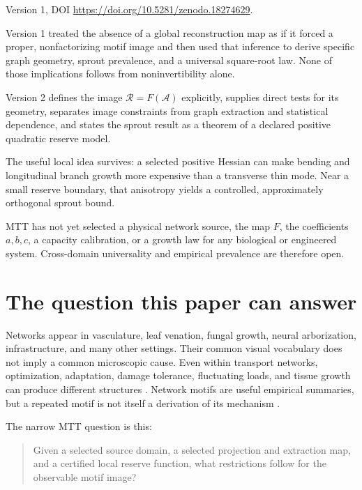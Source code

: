 \documentclass[11pt]{article}
\newcommand{\Adm}{\mathcal A}
\newcommand{\Image}{\mathcal R}
\begin{document}
\begin{description}[style=nextline]
\item[Supersedes.]
Version 1, DOI
\url{https://doi.org/10.5281/zenodo.18274629}.
\item[Reason.]
Version 1 treated the absence of a global reconstruction map as if it forced
a proper, nonfactorizing motif image and then used that inference to derive
specific graph geometry, sprout prevalence, and a universal square-root
law.  None of those implications follows from noninvertibility alone.
\item[Resolution.]
Version 2 defines the image $\Image=F(\Adm)$ explicitly, supplies direct
tests for its geometry, separates image constraints from graph extraction
and statistical dependence, and states the sprout result as a theorem of a
declared positive quadratic reserve model.
\item[Retained content.]
The useful local idea survives: a selected positive Hessian can make bending
and longitudinal branch growth more expensive than a transverse thin mode.
Near a small reserve boundary, that anisotropy yields a controlled,
approximately orthogonal sprout bound.
\item[Open boundary.]
MTT has not yet selected a physical network source, the map $F$, the
coefficients $a,b,c$, a capacity calibration, or a growth law for any
biological or engineered system.  Cross-domain universality and empirical
prevalence are therefore open.
\end{description}

\tableofcontents

\section{The question this paper can answer}

Networks appear in vasculature, leaf venation, fungal growth, neural
arborization, infrastructure, and many other settings.  Their common visual
vocabulary does not imply a common microscopic cause.  Even within transport
networks, optimization, adaptation, damage tolerance, fluctuating loads, and
tissue growth can produce different structures
\cite{katifori2010,ronellenfitsch2016,corson2010}.  Network motifs are useful
empirical summaries, but a repeated motif is not itself a derivation of its
mechanism \cite{milo2002,newman2018}.

The narrow MTT question is this:

\begin{quote}
Given a selected source domain, a selected projection and extraction map,
and a certified local reserve function, what restrictions follow for the
observable motif image?
\end{quote}
\end{document}
